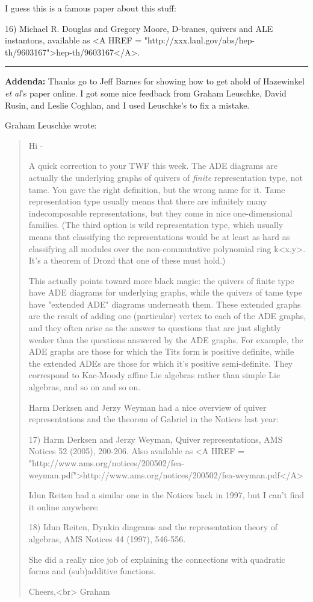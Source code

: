 I guess this is a famous paper about this stuff:

16) Michael R. Douglas and Gregory Moore, D-branes, quivers and ALE
instantons, available as <A HREF = "http://xxx.lanl.gov/abs/hep-th/9603167">hep-th/9603167</A>.

\par\noindent\rule{\textwidth}{0.4pt}
\textbf{Addenda:} 
Thanks go to Jeff Barnes for showing how to get ahold of Hazewinkel
\emph{et al}'s paper online.
I got some nice feedback from Graham Leuschke, David
Rusin, and Leslie Coghlan, and I used Leuschke's to fix a mistake. 

Graham Leuschke wrote:

\begin{quote}
  Hi - 

  A quick correction to your TWF this week.  The ADE diagrams are 
  actually the underlying graphs of quivers of \emph{finite} representation 
  type, not tame.  You gave the right definition, but the wrong name 
  for it.  Tame representation type usually means that there are 
  infinitely many indecomposable representations, but they come in 
  nice one-dimensional families.  (The third option is wild representation 
  type, which usually means that classifying the representations would 
  be at least as hard as classifying all modules over the non-commutative 
  polynomial ring k<x,y>.  It's a theorem of Drozd that one of these must 
  hold.)

  This actually points toward more black magic: the quivers of finite type 
  have ADE diagrams for underlying graphs, while the quivers of tame type 
  have "extended ADE" diagrams underneath them.  These extended graphs 
  are the result of adding one (particular) vertex to each of the ADE 
  graphs, and they often arise as the answer to questions that are just 
  slightly weaker than the questions answered by the ADE graphs.  For 
  example, the ADE graphs are those for which the Tits form is positive 
  definite, while the extended ADEs are those for which it's positive 
  semi-definite.    They correspond to Kac-Moody affine Lie algebras 
  rather than simple Lie algebras, and so on and so on.

  Harm Derksen and Jerzy Weyman had a nice overview of quiver 
  representations and the theorem of Gabriel in the Notices last year:

  17) Harm Derksen and Jerzy Weyman, Quiver representations, 
  AMS Notices 52 (2005), 200-206.  Also available as
  <A HREF = "http://www.ams.org/notices/200502/fea-weyman.pdf">http://www.ams.org/notices/200502/fea-weyman.pdf</A>

  Idun Reiten had a similar one in the Notices back in 1997, but I 
  can't find it online anywhere:

  18) Idun Reiten, Dynkin diagrams and the representation theory of 
  algebras, AMS Notices 44 (1997), 546-556.

  She did a really nice job of explaining the connections with 
  quadratic forms and (sub)additive functions.

  Cheers,<br>
  Graham
\end{quote}

